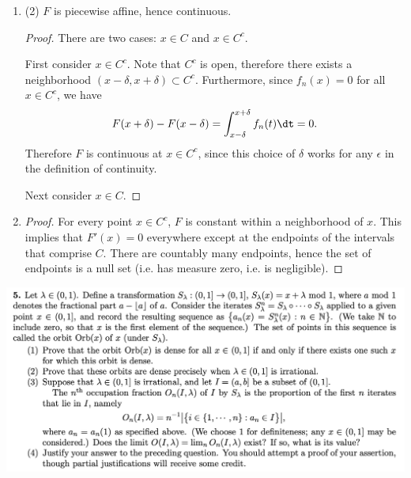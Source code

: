 \begin{enumerate}[label=(4.\arabic*)]
\item (2) $F$ is piecewise affine, hence continuous.
  \begin{proof}
    There are two cases: $x \in C$ and $x \in C^c$.

    First consider $x \in C^c$. Note that $C^c$ is open, therefore there exists a
    neighborhood $(x - \delta, x + \delta) \subset C^c$. Furthermore, since $f_n(x) = 0$ for all $x \in C^c$,
    we have
    \begin{align*}
      F(x + \delta) - F(x - \delta) = \int_{x-\delta}^{x+\delta}f_n(t) \dt = 0.
    \end{align*}
    Therefore $F$ is continuous at $x \in C^c$, since this choice of $\delta$ works for any $\epsilon$ in the
    definition of continuity.

    Next consider $x \in C$.
  \end{proof}


\item
  \begin{proof}
    For every point $x \in C^c$, $F$ is constant within a neighborhood of $x$. This implies that $F'(x) = 0$
    everywhere except at the endpoints of the intervals that comprise $C$. There are countably many endpoints,
    hence the set of endpoints is a null set (i.e. has measure zero, i.e. is negligible).
  \end{proof}
\end{enumerate}


\newpage
\begin{mdframed}
  \includegraphics[width=400pt]{img/analysis--berkeley-202a-hw-8c2b.png}
\end{mdframed}

